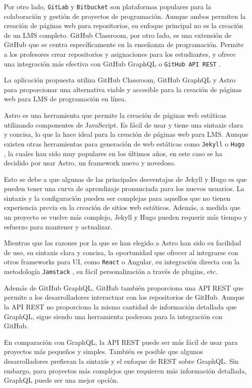 Por otro lado, \verb|GitLab| \cite{gitlab} y \verb|Bitbucket| \cite{bitbucket} son plataformas populares para la colaboración y gestión de proyectos de programación. Aunque ambos permiten la creación de páginas web para repositorios, su enfoque principal no es la creación de un LMS completo. GitHub Classroom, por otro lado, es una extensión de GitHub que se centra específicamente en la enseñanza de programación. Permite a los profesores crear repositorios y asignaciones para los estudiantes, y ofrece una integración más efectiva con GitHub GraphQL o \verb|GitHub API REST| \cite{github-rest}.

La aplicación propuesta utiliza GitHub Classroom, GitHub GraphQL y Astro para proporcionar una alternativa viable y accesible para la creación de páginas web para LMS de programación en línea.

Astro es una herramienta que permite la creación de páginas web estáticas utilizando componentes de JavaScript. Es fácil de usar y tiene una sintaxis clara y concisa, lo que la hace ideal para la creación de páginas web para LMS. Aunque existen otras herramientas para generación de web estáticas como \verb|Jekyll| \cite{jekyll} o \verb|Hugo| \cite{hugo}, la cuales han sido muy populares en los últimos años, en este caso se ha decidido por usar Astro, un framework nuevo y novedoso.

Esto se debe a que algunas de las principales desventajas de Jekyll y Hugo es que pueden tener una curva de aprendizaje pronunciada para los nuevos usuarios. La sintaxis y la configuración pueden ser complejas para aquellos que no tienen experiencia previa en la creación de sitios web estáticos. Además, a medida que un proyecto se vuelve más complejo, Jekyll y Hugo pueden requerir más tiempo y esfuerzo para mantener y actualizar.

Mientras que las razones por la que se han elegido a Astro han sido su facilidad de uso, su sintaxis clara y concisa, la oportunidad que ofrecer al integrarse con otros frameworks para UI, como \verb|React| \cite{react} o Angular\cite{angular}, su integración directa con la metodología \verb|Jamstack| \cite{jamstack}, su fácil personalización a través de plugins, etc.

Además de GitHub GraphQL, GitHub también proporciona una API REST que permite a los desarrolladores interactuar con los repositorios de GitHub. Aunque la API REST no proporciona la misma cantidad de información detallada que GraphQL, sigue siendo una herramienta poderosa para la integración con GitHub.

En comparación con GraphQL, la API REST puede ser más fácil de usar para proyectos más pequeños y simples. También es posible que algunos desarrolladores prefieran la sintaxis y el enfoque de REST sobre GraphQL. Sin embargo, para proyectos más complejos que requieren más información detallada, GraphQL puede ser una mejor opción.
